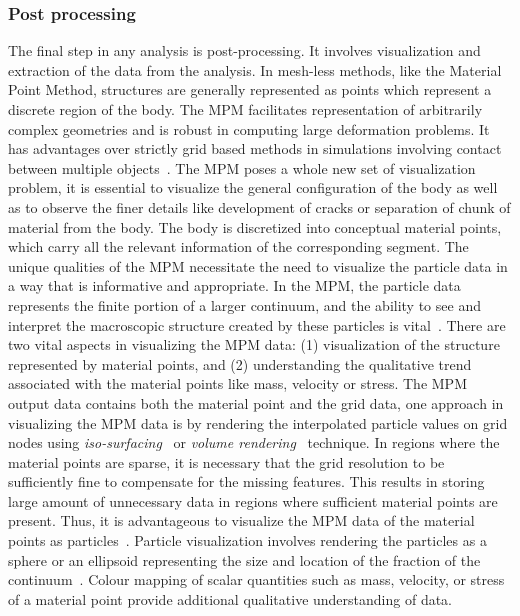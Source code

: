 \subsubsection{Post processing}

The final step in any analysis is post-processing. It involves visualization 
and extraction of the data from the analysis. In mesh-less methods, like the 
Material Point Method, structures are generally represented as points which 
represent a discrete region of the body. The MPM facilitates representation of 
arbitrarily complex geometries and is robust in computing large deformation 
problems. It has advantages over strictly grid based methods in simulations 
involving contact between multiple objects~\citep{Bardenhagen2000}. The MPM 
poses a whole new set of visualization problem, it is essential to visualize 
the general configuration of the body as well as to observe the finer details 
like development of cracks or separation of chunk of material from the body. 
The body is discretized into conceptual material points, which carry all the 
relevant information of the corresponding segment. The unique qualities of the 
MPM necessitate the need to visualize the particle data in a way that is 
informative and appropriate. In the MPM, the particle data represents the 
finite portion of a larger continuum, and the ability to see and interpret the 
macroscopic structure created by these particles is vital~\citep{bigler2006}. 
There are two vital aspects in visualizing the MPM data: (1) visualization of 
the structure represented by material points, and (2) understanding the 
qualitative trend associated with the material points like mass, velocity or 
stress. The MPM output data contains both the material point and the grid data, 
one approach in visualizing the MPM data is by rendering the interpolated 
particle values on grid nodes using \textit{iso-surfacing}~\citep{lorensen1987} 
or \textit{volume rendering}~\citep{levoy1988} technique. In regions where the 
material points are sparse, it is necessary that the grid resolution to be 
sufficiently fine to compensate for the missing features. This results in 
storing large amount of unnecessary data in regions where sufficient material 
points are present. Thus, it is advantageous to visualize the MPM data of the 
material points as particles~\citep{bigler2006}. Particle visualization 
involves rendering the particles as a sphere or an ellipsoid representing the 
size and location of the fraction of the 
continuum~\citep{kuester2001,krogh1997,gumhold2003}. Colour mapping of scalar 
quantities such as mass, velocity, or stress of a material point provide 
additional qualitative understanding of data. 

